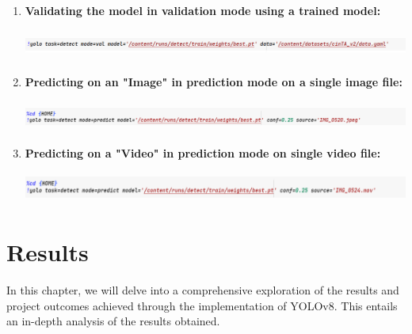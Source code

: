 \documentclass[12 pt]{report}
\begin{document}
{\begin{enumerate}
    \item \textbf{Validating the model in validation mode using a trained model:}
          \begin{center}
            \includegraphics[width=17cm, height=1cm]{validating the yolomodel on the dataset.png}
          \end{center}

    \item \textbf{Predicting on an "Image" in prediction mode on a single image file:}
          \begin{center}
            \includegraphics[width=17cm, height=1cm]{Testing the model on real-world img.png}
          \end{center}

    \item \textbf{Predicting on a "Video" in prediction mode on single video file:}
          \begin{center}
            \includegraphics[width=17cm, height=1cm]{Testing the model on real-world video.png}
          \end{center}

  \end{enumerate}
 }

\newpage
\chapter{Results}
\justify
 {
  In this chapter, we will delve into a comprehensive exploration of the results and project outcomes achieved through the implementation of YOLOv8. This entails an in-depth analysis of the results obtained.
 }
\end{document}
